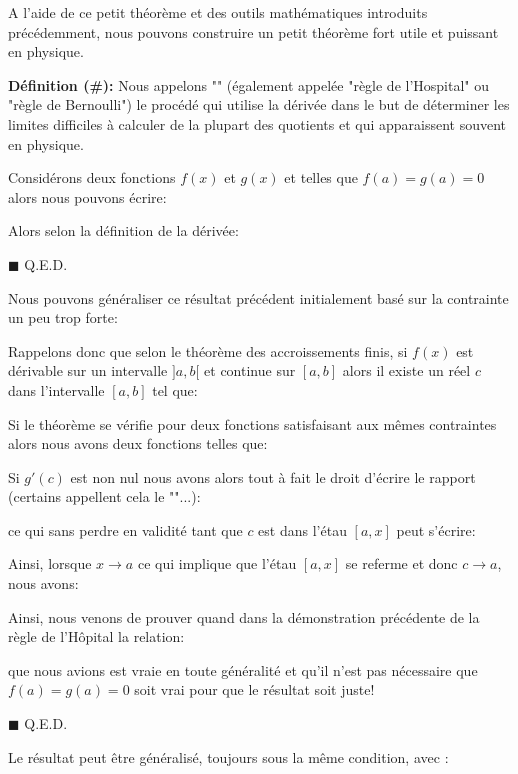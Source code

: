 	A l'aide de ce petit théorème et des outils mathématiques introduits précédemment, nous pouvons construire un petit théorème fort utile et puissant en physique.
	
	\textbf{Définition (\#\mydef):} Nous appelons "" (également appelée "règle de l'Hospital"\label{Hospital rule} ou "règle de Bernoulli") le procédé qui utilise la dérivée dans le but de déterminer les limites difficiles à calculer de la plupart des quotients et qui apparaissent souvent en physique.

	\begin{dem}
	Considérons deux fonctions $f(x)$ et $g(x)$ et telles que $f(a)=g(a)=0$ alors nous pouvons écrire:
	
	Alors selon la définition de la dérivée:
	
	\begin{flushright}
		$\blacksquare$  Q.E.D.
	\end{flushright}		
	\end{dem}
	Nous pouvons généraliser ce résultat précédent initialement basé sur la contrainte un peu trop forte:
	
	\begin{dem}
	Rappelons donc que selon le théorème des accroissements finis, si $f(x)$ est dérivable sur un intervalle $]a, b[$ et continue sur $[a, b]$ alors il existe un réel $c$ dans l'intervalle $[a, b]$ tel que:\
	
	Si le théorème se vérifie pour deux fonctions satisfaisant aux mêmes contraintes alors nous avons deux fonctions telles que:
	
	Si $g'(c)$ est non nul nous avons alors tout à fait le droit d'écrire le rapport (certains appellent cela le ""...):
	
	ce qui sans perdre en validité tant que $c$ est dans l'étau $[a, x]$ peut s'écrire:
	
	Ainsi, lorsque $x \rightarrow a$ ce qui implique que l'étau $[a, x]$ se referme et donc $c \rightarrow a$, nous avons:
	
	Ainsi, nous venons de prouver quand dans la démonstration précédente de la règle de l'Hôpital la relation:
	
	que nous avions est vraie en toute généralité et qu'il n'est pas nécessaire que $f(a)=g(a)=0$ soit vrai pour que le résultat soit juste!
	\begin{flushright}
		$\blacksquare$  Q.E.D.
	\end{flushright}
	\end{dem}
	\begin{tcolorbox}[title=Remarque,colframe=black,arc=10pt]
	Le résultat peut être généralisé, toujours sous la même condition, avec :
	
	\end{tcolorbox}
	
